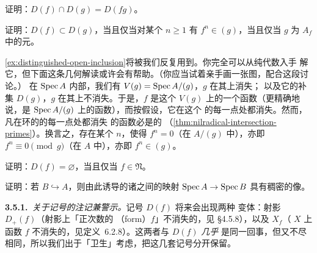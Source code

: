 \begin{exercise}[容易的练习]\label{ex:distinguished-opens-intersection}
证明：$D(f)\cap D(g)=D(fg)$。
\end{exercise}

\begin{exercise}
\label{ex:distinguished-open-inclusion}
证明：$D(f)\subset D(g)$，当且仅当对某个 $n\ge 1$ 有 $f^n\in(g)$，当且仅当 $g$
为 $A_f$ 中的\trInvertible{}元。
\end{exercise}

\cref{ex:distinguished-open-inclusion}将被我们反复用到。你完全可以从纯代数入手
解它，但下面这条几何解读或许会有帮助。（你应当试着亲手画一张图，配合这段讨论。）
在 $\operatorname{Spec} A$ 内部，我们有\trClosedSubset{} $V(g)=\operatorname{Spec} A/(g)$，$g$ 在其上消失；
以及它的补集 $D(g)$，$g$ 在其上不消失。于是，$f$ 是这个\trClosedSubset{} $V(g)$
上的一个函数（更精确地说，是 $\operatorname{Spec} A/(g)$ 上的函数），而按假设，它在这个%
\trClosedSubset{}的每一点处都消失。然而，凡在环的\trSpectrum{}的每一点处都消失
的函数必是\trNilpotent{}的
（\cref{thm:nilradical-intersection-primes}）。换言之，存在某个 $n$，使得
$f^n=0$（在 $A/(g)$ 中），亦即 $f^n\equiv 0\pmod{g}$（在 $A$ 中），亦即
$f^n\in(g)$。

\begin{exercise}[容易的练习]\label{ex:distinguished-open-empty}
证明：$D(f)=\varnothing$，当且仅当 $f\in\mathfrak{N}$。
\end{exercise}

\begin{exercise}
\label{ex:injective-ring-map-dense-image}
证明：若 $B\hookrightarrow A$，则由此诱导的诸\trTopologicalSpace{}之间的映射
$\operatorname{Spec} A\to\operatorname{Spec} B$ 具有稠密的像。
\end{exercise}

\textbf{3.5.1.}\ \emph{关于记号的注记兼警示。}\quad 记号 $D(f)$ 将来会出现两种
变体：射影\trDistinguishedOpen{} $D_+(f)$（射影\trScheme{}上「正次数的%
\trForm（form）$f$」不消失的\trLocus，见 \S4.5.8），以及 $X_f$（\trScheme{} $X$ 上
函数 $f$ 不消失的\trLocus，见\mbox{定义~6.2.8}）。这两者与 $D(f)$ \emph{几乎}
是同一回事，但又不尽相同，所以我们出于「卫生」考虑，把这几套记号分开保留。

